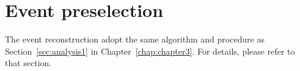 \section{Event preselection}
\label{sec:analysisEXO-14-009}


The event reconstruction adopt the same algorithm and procedure as
Section~\ref{sec:analysis1} in Chapter~\ref{chap:chapter3}. For details, please refer to that section.  




